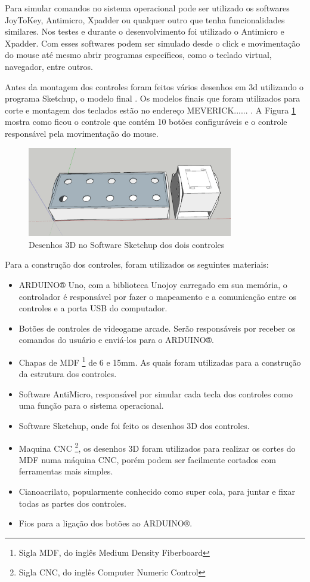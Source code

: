 \documentclass[
	12pt,			%
	openright,		%
	oneside,			%
	a4paper,			%
	chapter=TITLE,		%
	english,			%
	brazil,			%
	]{abntex2}
\begin{document}
Para simular comandos no sistema operacional pode ser utilizado os softwares JoyToKey, Antimicro, Xpadder ou qualquer outro que tenha funcionalidades similares. Nos testes e durante o desenvolvimento foi utilizado o Antimicro e Xpadder. Com esses softwares podem ser simulado desde o click e movimentação do mouse até mesmo abrir programas específicos, como o teclado virtual, navegador, entre outros.

Antes da montagem dos controles foram feitos vários desenhos em 3d utilizando o programa Sketchup, o modelo final . Os modelos finais que foram utilizados para corte e montagem dos teclados estão no endereço MEVERICK...... . A Figura \ref{img:img-17} mostra como ficou o controle que contém 10 botões configuráveis e o controle responsável pela movimentação do mouse.

\begin{figure}[H]
	\centering
		\includegraphics[width=0.8\textwidth]{./img/img-17.png}
		\caption{Desenhos 3D no Software Sketchup dos dois controles}
		\label{img:img-17}
\end{figure}

Para a construção dos controles, foram utilizados os seguintes materiais:
\begin{itemize}
\item ARDUINO® Uno, com a biblioteca Unojoy carregado em sua memória, o controlador é responsável por fazer o mapeamento e a comunicação entre os controles e a porta USB do computador.
\item Botões de controles de videogame arcade. Serão responsáveis por receber os comandos do usuário e enviá-los para o ARDUINO®.
\item Chapas de MDF \footnote{Sigla MDF, do inglês Medium Density Fiberboard} de 6 e 15mm. As quais foram utilizadas para a construção da estrutura dos controles.
\item Software AntiMicro, responsável por simular cada tecla dos controles como uma função para o sistema operacional.
\item Software Sketchup, onde foi feito os desenhos 3D dos controles.
\item Maquina CNC \footnote{Sigla CNC, do inglês Computer Numeric Control}, os desenhos 3D foram utilizados para realizar os cortes do MDF numa máquina CNC, porém podem ser facilmente cortados com ferramentas mais simples.
\item Cianoacrilato, popularmente conhecido como super cola, para juntar e fixar todas as partes dos controles.
\item Fios para a ligação dos botões ao ARDUINO®.
\end{itemize}
\end{document}
